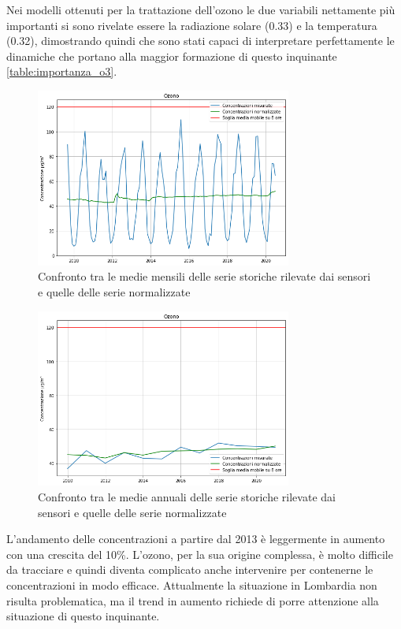 Nei modelli ottenuti per la trattazione dell'ozono le due variabili nettamente più importanti si sono rivelate essere la radiazione solare (0.33) e la temperatura (0.32), dimostrando quindi che sono stati capaci di interpretare perfettamente le dinamiche che portano alla maggior formazione di questo inquinante \ref{table:importanza_o3}.

\begin{figure}[h]
\centering
\includegraphics[width=0.75\textwidth]{o3_medie_mensili}
\caption{Confronto tra le medie mensili delle serie storiche rilevate dai sensori e quelle delle serie normalizzate}
\label{fig:o3_medie_mensili}
\end{figure}

\begin{figure}[h]
\centering
\includegraphics[width=0.75\textwidth]{o3_medie_annuali}
\caption{Confronto tra le medie annuali delle serie storiche rilevate dai sensori e quelle delle serie normalizzate}
\label{fig:o3_medie_annuali}
\end{figure}

L'andamento delle concentrazioni a partire dal 2013 è leggermente in aumento con una crescita del 10\%. L'ozono, per la sua origine complessa, è molto difficile da tracciare e quindi diventa complicato anche intervenire per contenerne le concentrazioni in modo efficace. Attualmente la situazione in Lombardia non risulta problematica, ma il trend in aumento richiede di porre attenzione alla situazione di questo inquinante.

